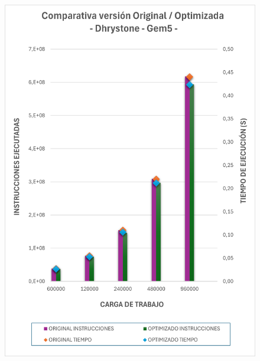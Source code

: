 \begin{figure}[H]
    \centering
    \begin{minipage}[b]{.48\textwidth}
    \centering
        \includegraphics[width=0.95\linewidth, height=1.33\textwidth]{figs/dhrystoneGem5.png}
    \end{minipage}
    \begin{minipage}[b]{.48\textwidth}
    \centering

\end{minipage}
\end{figure}
